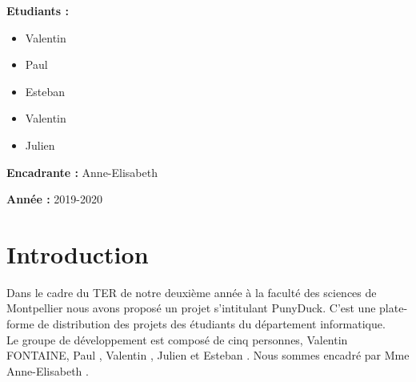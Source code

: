 \documentclass{report}
\begin{document}
\begin{titlepage}
\begin{minipage}[t]{8.5cm}
	\begin{flushleft}
	    \large{\textbf{Etudiants :}}
	    \begin{itemize}
	        \item \large{Valentin }
	        \item \large{Paul  } 
	        \item \large{Esteban }
	        \item \large{Valentin }
	        \item \large{Julien }
	    \end{itemize}
		\vspace{0.5cm}
		\large{\textbf{Encadrante :}}
		\large{Anne-Elisabeth } \\
	\end{flushleft}
\end{minipage}
\hfill
\begin{minipage}[t]{8cm}
	\begin{flushright} 
		\large{\textbf{Année :}} 
		\large{2019-2020}
	\end{flushright}
\end{minipage}
\end{titlepage}

\begin{titlepage}
\renewcommand{\contentsname}{Sommaire}
\large{\tableofcontents}
\thispagestyle{empty}
\end{titlepage}

\renewcommand{\chaptername}{Partie}



\chapter{Introduction} %
Dans le cadre du TER de notre deuxième année à la faculté des sciences de Montpellier nous avons proposé un projet s'intitulant PunyDuck. C'est une plate-forme de distribution des projets des étudiants du département informatique.\\

Le groupe de développement est composé de cinq personnes, Valentin \textsc{FONTAINE}, Paul , Valentin , Julien  et Esteban . Nous sommes encadré par Mme Anne-Elisabeth .
\end{document}
